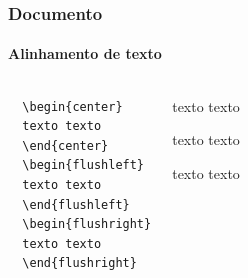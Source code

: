 \begin{frame}[fragile]
\frametitle{Documento}
\framesubtitle{Alinhamento de texto}
  \scriptsize
  \begin{columns}[c]
  \begin{verbatim}
  \begin{center}
  texto texto
  \end{center}
  \begin{flushleft}
  texto texto
  \end{flushleft}
  \begin{flushright}
  texto texto
  \end{flushright}
  \end{verbatim} 
  \begin{fmpage}{\textwidth}
  \begin{center}
  texto texto
  \end{center}
  \begin{flushleft}
  texto texto
  \end{flushleft}
  \begin{flushright}
  texto texto
  \end{flushright}
  \end{fmpage}
  \end{columns}
\end{frame}

